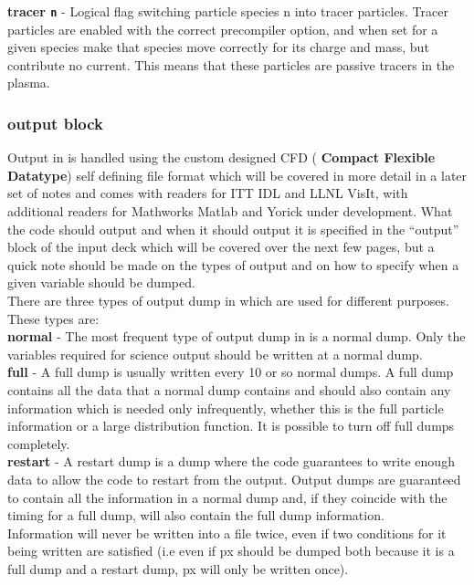 \documentclass[12pt,a4paper]{article}
\newcommand{\emphtext}{\color{warwickdark} \fontfamily{phv}\selectfont\Large\bf}
\newcommand{\inlinecode}[1]{{\color{warwickred} \bf\texttt{#1}}}
\newcommand{\inlineemph}[1]{{\color{warwicklight} \bf{#1}}}
\newcommand{\EPOCH}{{\color{warwickdark}\fontfamily{phv}\selectfont{EPOCH}}}
\begin{document}
{\emphtext tracer\inlinecode{n}} - Logical flag switching particle species n
into tracer particles. Tracer particles are enabled with the correct
precompiler option, and when set for a given species make that species move
correctly for its charge and mass, but contribute no current. This means that
these particles are passive tracers in the plasma.\\

\subsubsection{\inlineemph{output} block}
Output in {\EPOCH} is handled using the custom designed CFD (\inlineemph{Compact
Flexible Datatype}) self defining file format which will be covered in more
detail in a later set of notes and comes with readers for ITT IDL and LLNL
VisIt, with additional readers for Mathworks Matlab and Yorick under
development. What the code should output and when it should output it is
specified in the ``output'' block of the input deck which will be covered over
the next few pages, but a quick note should be made on the types of output and
on how to specify when a given variable should be dumped.\\

There are three types of output dump in {\EPOCH} which are used for different
purposes. These types are:\\

{\emphtext normal} - The most frequent type of output dump in {\EPOCH} is a
normal dump. Only the variables required for science output should be written
at a normal dump.\\

{\emphtext full} - A full dump is usually written every 10 or so normal
dumps. A full dump contains all the data that a normal dump contains and should
also contain any information which is needed only infrequently, whether this is
the full particle information or a large distribution function. It is possible
to turn off full dumps completely.\\

{\emphtext restart} - A restart dump is a dump where the code guarantees to
write enough data to allow the code to restart from the output. Output dumps
are guaranteed to contain all the information in a normal dump and, if they
coincide with the timing for a full dump, will also contain the full dump
information.\\

Information will never be written into a file twice, even if two conditions for
it being written are satisfied (i.e even if px should be dumped both because it
is a full dump and a restart dump, px will only be written once).\\
\end{document}
